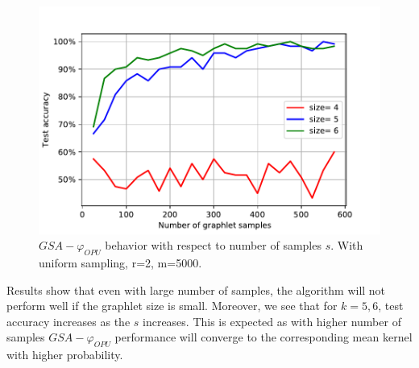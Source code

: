 \begin{figure}[H]
\centering
\includegraphics[scale=0.5]{Dissertation/figs/samples_num.pdf}
\caption[$GSA-\varphi_{OPU}$ behavior with respect to number of samples $s$]{$GSA-\varphi_{OPU}$ behavior with respect to number of samples $s$. With uniform sampling, r=2, m=5000.}
\label{fig:varying_samples_num}
\end{figure}
Results show that even with large number of samples, the algorithm will not perform well if the graphlet size is small. Moreover, we see that for $k={5,6}$, test accuracy increases as the $s$ increases. This is expected as with higher number of samples $GSA-\varphi_{OPU}$ performance will converge to the corresponding mean kernel with higher probability.

